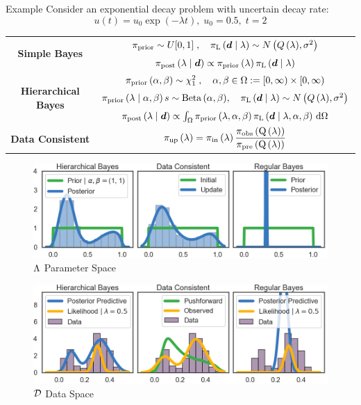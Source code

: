 \begin{block}{Example}
\centering
Consider an exponential decay problem with uncertain decay rate:
\begin{equation*}
       u(t) = u_0\exp(-\lambda t), \; u_0 = 0.5 ,\; t=2
   \end{equation*}

\begin{tabular}{c|c}
\toprule
\multirow{2}{*}{\textbf{Simple Bayes}} & 
$\prior \sim U[0,1]\; , \quad  \likelihood\qGivelam\sim N\left(Q\lam,\sigma^2\right) $ \\
                                        & $\bayes$ \\ 
\midrule
\multirow{3}{*}{\textbf{Hierarchical Bayes}}   &
        $\prior\hyper \sim \chi^2_1\; , \quad \alpha,\beta\in\Omega :=[0,\infty)\times[0,\infty)$ \\
        & $\prior\lamGiveH s\sim \text{Beta}\hyper, \quad \likelihood\qGivelam \sim N\left(Q\lam,\sigma^2\right)$ \\
        & $\Hbayes$ \\
\midrule
\textbf{Data Consistent} &  $\dci$\\
\bottomrule
\end{tabular}
\vspace{1cm}
\begin{figure}
        \includegraphics[width=32cm]{figures/distr_EX_lambda_space.png}
        \vspace{-0.5cm}
        \centering
        \caption{\large $\pspace$ Parameter Space }
\end{figure}
\vspace{-0.5cm}
\begin{figure}
        \includegraphics[width=32cm]{figures/distr_EX_data_space.png}
        \vspace{-0.5cm}
        \centering
        \caption{\large $\dspace$ Data Space  }
\end{figure}


\end{block}
